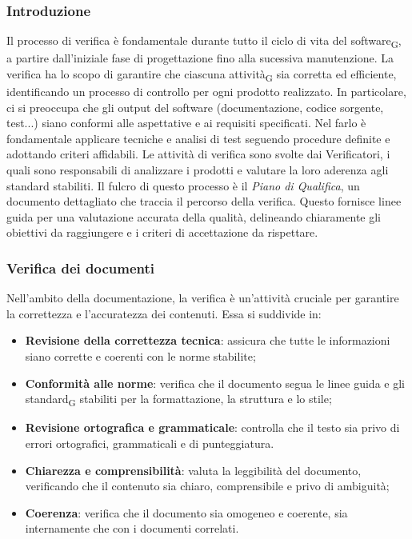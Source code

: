 \subsubsection{Introduzione}
Il processo di verifica è fondamentale durante tutto il ciclo di vita del {software\textsubscript{G}}, a partire dall'iniziale fase
di progettazione fino alla sucessiva manutenzione. La verifica ha lo scopo di garantire che ciascuna {attività\textsubscript{G}}
sia corretta ed efficiente, identificando un processo di controllo per ogni prodotto realizzato. In particolare, ci si preoccupa che gli output
del software (documentazione, codice sorgente, test...) siano conformi alle aspettative e ai requisiti specificati. Nel farlo è fondamentale
applicare tecniche e analisi di test seguendo procedure definite e adottando criteri affidabili.
Le attività di verifica sono svolte dai Verificatori, i quali sono responsabili di analizzare i prodotti e valutare la loro aderenza agli standard
stabiliti. Il fulcro di questo processo è il \textit{Piano di Qualifica}, un documento dettagliato che traccia il percorso della verifica.
Questo fornisce linee guida per una valutazione accurata della qualità, delineando chiaramente gli obiettivi da raggiungere e i criteri di
accettazione da rispettare.

\subsubsection{Verifica dei documenti} \label{verifica_dei_documenti}
Nell'ambito della documentazione, la verifica è un'attività cruciale per garantire la correttezza e l'accuratezza dei contenuti. Essa si suddivide in:
\begin{itemize}
    \item \textbf{Revisione della correttezza tecnica}: assicura che tutte le informazioni siano corrette e coerenti con le norme stabilite;
    \item \textbf{Conformità alle norme}: verifica che il documento segua le linee guida e gli {standard\textsubscript{G}} 
        stabiliti per la formattazione, la struttura e lo stile;
    \item \textbf{Revisione ortografica e grammaticale}: controlla che il testo sia privo di errori ortografici, grammaticali e di punteggiatura.
    \item \textbf{Chiarezza e comprensibilità}: valuta la leggibilità del documento, verificando che il contenuto sia chiaro, comprensibile e privo di ambiguità;
    \item \textbf{Coerenza}: verifica che il documento sia omogeneo e coerente, sia internamente che con i documenti correlati.
\end{itemize}

